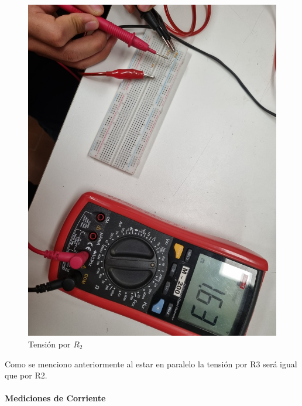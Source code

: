 \documentclass[a4paper,12pt]{article}
\begin{document}
\begin{figure}[H]
\begin{minipage}{0.40\textwidth}
        \includegraphics[width=\linewidth]{imagenes/tensioni2.jpg}
        \caption*{Tensión por $R_2$}
    \end{minipage}
\end{figure}

Como se menciono anteriormente al estar en paralelo la tensión por R3 será igual que por R2.

\vspace{9cm}

\paragraph{Mediciones de Corriente}
\paragraph{}
\end{document}
